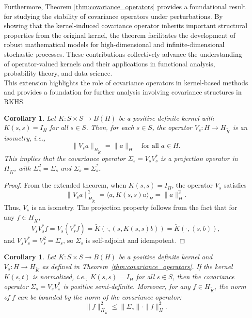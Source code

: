 \documentclass[11pt]{amsart}
\newtheorem{corollary}[theorem]{Corollary}
\theoremstyle{definition}
\numberwithin{equation}{section}
\begin{document}
Furthermore, Theorem \ref{thm:covariance_operators} provides a foundational result for studying the stability of covariance operators under perturbations. By showing that the kernel-induced covariance operator inherits important structural properties from the original kernel, the theorem facilitates the development of robust mathematical models for high-dimensional and infinite-dimensional stochastic processes. These contributions collectively advance the understanding of operator-valued kernels and their applications in functional analysis, probability theory, and data science.\\

\noindent
This extension highlights the role of covariance operators in kernel-based methods and provides a foundation for further analysis involving covariance structures in RKHS.

\begin{corollary}
Let $K: S \times S \to B(H)$ be a positive definite kernel with $K(s,s) = I_H$ for all $s \in S$. Then, for each $s \in S$, the operator $V_s: H \to H_{\tilde{K}}$ is an isometry, i.e.,
\[
\| V_s a \|_{H_{\tilde{K}}} = \| a \|_H \quad \text{for all } a \in H.
\]
This implies that the covariance operator $\Sigma_s = V_s V_s^*$ is a projection operator in $H_{\tilde{K}}$, with $\Sigma_s^2 = \Sigma_s$ and $\Sigma_s = \Sigma_s^*$.
\end{corollary}

\begin{proof}
From the extended theorem, when $K(s,s) = I_H$, the operator $V_s$ satisfies
\[
\| V_s a \|_{H_{\tilde{K}}}^2 = \langle a, K(s,s) a \rangle_H = \| a \|_H^2.
\]
Thus, $V_s$ is an isometry. The projection property follows from the fact that for any $f \in H_{\tilde{K}}$,
\[
V_s V_s^* f = V_s (V_s^* f) = \tilde{K}(\cdot, (s, K(s,s) b)) = \tilde{K}(\cdot, (s, b)),
\]
and $V_s V_s^* = V_s^2 = \Sigma_s$, so $\Sigma_s$ is self-adjoint and idempotent.
\end{proof}

\begin{corollary}
Let $K: S \times S \to B(H)$ be a positive definite kernel and $V_s: H \to H_{\tilde{K}}$ as defined in Theorem~\ref{thm:covariance_operators}. If the kernel $K(s,t)$ is normalized, i.e., $K(s,s) = I_H$ for all $s \in S$, then the covariance operator $\Sigma_s = V_s V_s^*$ is positive semi-definite. Moreover, for any $f \in H_{\tilde{K}}$, the norm of $f$ can be bounded by the norm of the covariance operator:
\[
\| f \|_{H_{\tilde{K}}}^2 \leq \| \Sigma_s \| \cdot \| f \|_H^2.
\]
\end{corollary}
\end{document}

